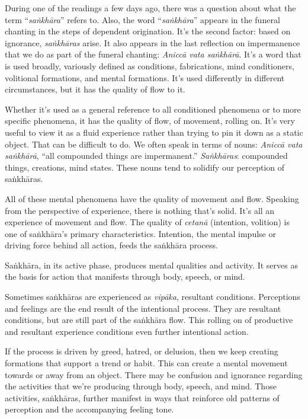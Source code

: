 During one of the readings a few days ago, there was a question about what the term ``\emph{saṅkhāra}'' refers to. Also, the word ``\emph{saṅkhāra}'' appears in the funeral chanting in the steps of dependent origination. It's the second factor: based on ignorance, \emph{saṅkhāras} arise. It also appears in the last reflection on impermanence that we do as part of the funeral chanting: \emph{Aniccā vata saṅkhārā}. It's a word that is used broadly, variously defined as conditions, fabrications, mind conditioners, volitional formations, and mental formations. It's used differently in different circumstances, but it has the quality of flow to it.

Whether it's used as a general reference to all conditioned phenomena or to more specific phenomena, it has the quality of flow, of movement, rolling on. It's very useful to view it as a fluid experience rather than trying to pin it down as a static object. That can be difficult to do. We often speak in terms of nouns: \emph{Aniccā vata saṅkhārā}, ``all compounded things are impermanent.'' \emph{Saṅkhāras}: compounded things, creations, mind states. These nouns tend to solidify our perception of saṅkhāras.

All of these mental phenomena have the quality of \linebreak movement and flow. Speaking from the perspective of experience, there is nothing that's solid. It's all an experience \linebreak of movement and flow. The quality of \emph{cetanā} (intention, volition) is one of saṅkhāra's primary characteristics. Intention, the mental impulse or driving force behind all action, \linebreak feeds the saṅkhāra process.

Saṅkhāra, in its active phase, produces mental qualities and activity. It serves as the basis for action that manifests through body, speech, or mind.

Sometimes saṅkhāras are experienced as \emph{vipāka}, resultant conditions. Perceptions and feelings are the end result of the intentional process. They are resultant conditions, but are still part of the saṅkhāra flow. This rolling on of productive and resultant experience conditions even further intentional action.

If the process is driven by greed, hatred, or delusion, then we keep creating formations that support a trend or habit. This can create a mental movement towards or away from an object. There may be confusion and ignorance regarding the activities that we're producing through body, speech, and mind. Those activities, saṅkhāras, further manifest in ways that reinforce old patterns of perception and the accompanying feeling tone.


